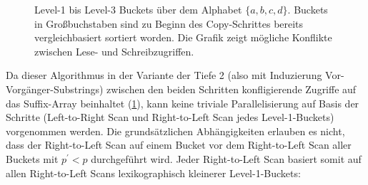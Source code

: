 \begin{figure}[h]
{
    }
    \caption[Parallelisierbarkeit der Copy-Technik]{Level-1 bis Level-3 Buckets über dem Alphabet \(\{a, b, c, d\}\).
    Buckets in Großbuchstaben sind zu Beginn des Copy-Schrittes bereits vergleichbasiert sortiert worden.
    Die Grafik zeigt mögliche Konflikte zwischen Lese- und Schreibzugriffen.}
    \label{fig:seward:parallel}
\end{figure}
Da dieser Algorithmus in der Variante der Tiefe 2 (also mit Induzierung Vor-Vorgänger-Substrings) zwischen den beiden Schritten konfligierende Zugriffe auf das Suffix-Array beinhaltet (\cref{fig:seward:parallel}), kann keine triviale Parallelisierung auf Basis der Schritte (Left-to-Right Scan und Right-to-Left Scan jedes Level-1-Buckets) vorgenommen werden.
Die grundsätzlichen Abhängigkeiten erlauben es nicht, dass der Right-to-Left Scan  auf einem Bucket  vor dem Right-to-Left Scan aller Buckets  mit \(p^\prime < p\) durchgeführt wird.
Jeder Right-to-Left Scan basiert somit auf allen Right-to-Left Scans lexikographisch kleinerer Level-1-Buckets:
